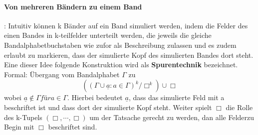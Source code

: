   \paragraph{Von mehreren Bändern zu einem Band}: Intuitiv können k Bänder auf ein Band simuliert werden, indem die Felder des einen Bandes in k-teilfelder unterteilt werden, die jeweils die gleiche Bandalphabetbuchstaben wie zufor als Beschreibung zulassen und es zudem erlaubt zu markieren, dass der simulierte Kopf des simulierten Bandes dort steht. Eine dieser Idee folgende Konstruktion wird als \textbf{Spurentechnik} bezeichnet. Formal: Übergang vom Bandalphabet \(\Gamma\) zu 
  \[
    ((\Gamma \cup{\underline{a} : a \in \Gamma})^{k}/{\Box}^{k}) \cup {\Box}
  \] 
  wobei \(\underline{a} \not \in \Gamma für a \in \Gamma\). Hierbei bedeutet \(\underline{a}\), dass das simulierte Feld mit a beschriftet ist und dass dort der simulierte Kopf steht. Weiter spielt \(\Box\) die Rolle des k-Tupels \((\Box, \cdots, \Box)\) um der Tatsache gerecht zu werden, dan alle Felderzu Begin mit \(\Box\) beschriftet sind.
  
